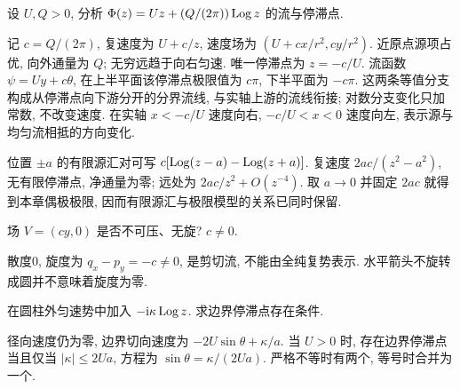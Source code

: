 \begin{example}
设 $U,Q>0$, 分析 $\Phi(z)=Uz+(Q/(2\pi))\operatorname{Log} z$ 的流与停滞点.
\end{example}
\begin{solution}
记 $c=Q/(2\pi)$, 复速度为 $U+c/z$, 速度场为 $(U+cx/r^2,cy/r^2)$. 近原点源项占优, 向外通量为 $Q$; 无穷远趋于向右匀速. 唯一停滞点为 $z=-c/U$. 流函数 $\psi=Uy+c\theta$, 在上半平面该停滞点极限值为 $c\pi$, 下半平面为 $-c\pi$. 这两条等值分支构成从停滞点向下游分开的分界流线, 与实轴上游的流线衔接; 对数分支变化只加常数, 不改变速度. 在实轴 $x<-c/U$ 速度向右, $-c/U<x<0$ 速度向左, 表示源与均匀流相抵的方向变化.
\end{solution}
位置 $\pm a$ 的有限源汇对可写 $c[\operatorname{Log}(z-a)-\operatorname{Log}(z+a)]$. 复速度 $2ac/(z^2-a^2)$, 无有限停滞点, 净通量为零; 远处为 $2ac/z^2+O(z^{-4})$. 取 $a\to0$ 并固定 $2ac$ 就得到本章偶极极限, 因而有限源汇与极限模型的关系已同时保留.

\begin{exercise}
场 $V=(cy,0)$ 是否不可压、无旋? $c\ne0$.
\end{exercise}
\begin{solution}
散度0, 旋度为 $q_x-p_y=-c\ne0$, 是剪切流, 不能由全纯复势表示. 水平箭头不旋转成圆并不意味着旋度为零.
\end{solution}
\begin{exercise}
在圆柱外匀速势中加入 $-\mathrm i\kappa\operatorname{Log} z$. 求边界停滞点存在条件.
\end{exercise}
\begin{solution}
径向速度仍为零, 边界切向速度为 $-2U\sin\theta+\kappa/a$. 当 $U>0$ 时, 存在边界停滞点当且仅当 $|\kappa|\le2Ua$, 方程为 $\sin\theta=\kappa/(2Ua)$. 严格不等时有两个, 等号时合并为一个.
\end{solution}

